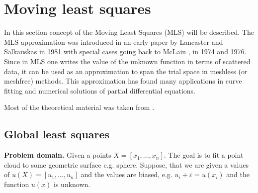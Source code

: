 \chapter{Moving least squares}
In this section concept of the Moving Least Squares (MLS) will be described. The MLS approximation was introduced in an early paper by Lancaster and Salkauskas  \cite{MLSSalkauskas} in 1981 with special cases going back to McLain  \cite{MLSMcLain1}, \cite{MLSMcLain2} in 1974 and 1976. Since in MLS one writes the value of the unknown function in terms of scattered data, it can be used as an approximation to span the trial space in meshless (or meshfree) methods. This approximation has found many applications in curve fitting and numerical solutions of partial differential equations.

Most of the theoretical material was taken from \cite{MLSIntro}.
\section{Global least squares}
\textbf{Problem domain.} Given a points $X = [x_1, ..., x_n]$. The goal is to fit a point cloud to some geometric surface e.g. sphere. Suppose, that we are given a values of $u(X) = [u_1, ..., u_n]$ and the values are biased, e.g. $u_i + \varepsilon = u(x_i)$ and the function $u(x)$ is unknown.

